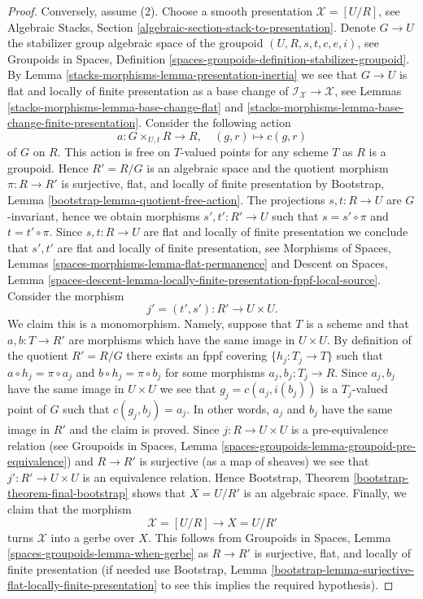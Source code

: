 \begin{proof}
\medskip\noindent
Conversely, assume (2). Choose a smooth presentation $\mathcal{X} = [U/R]$, see
Algebraic Stacks, Section \ref{algebraic-section-stack-to-presentation}.
Denote $G \to U$ the stabilizer group algebraic space of the groupoid
$(U, R, s, t, c, e, i)$, see
Groupoids in Spaces, Definition
\ref{spaces-groupoids-definition-stabilizer-groupoid}.
By
Lemma \ref{stacks-morphisms-lemma-presentation-inertia}
we see that $G \to U$ is flat and locally of finite presentation as
a base change of $\mathcal{I}_\mathcal{X} \to \mathcal{X}$, see
Lemmas \ref{stacks-morphisms-lemma-base-change-flat} and
\ref{stacks-morphisms-lemma-base-change-finite-presentation}.
Consider the following action
$$
a : G \times_{U, t} R \to R, \quad (g, r) \mapsto c(g, r)
$$
of $G$ on $R$. This action is free on $T$-valued points for any
scheme $T$ as $R$ is a groupoid. Hence $R' = R/G$ is an algebraic
space and the quotient morphism $\pi : R \to R'$ is surjective,
flat, and locally of finite presentation by
Bootstrap, Lemma \ref{bootstrap-lemma-quotient-free-action}.
The projections $s, t : R \to U$ are $G$-invariant, hence
we obtain morphisms $s' , t' : R' \to U$ such that $s = s' \circ \pi$
and $t = t' \circ \pi$.
Since $s, t : R \to U$ are flat and locally of finite presentation
we conclude that $s', t'$ are flat and locally of finite presentation, see
Morphisms of Spaces, Lemmas
\ref{spaces-morphisms-lemma-flat-permanence} and
Descent on Spaces, Lemma
\ref{spaces-descent-lemma-locally-finite-presentation-fppf-local-source}.
Consider the morphism
$$
j' = (t', s') : R' \longrightarrow U \times U.
$$
We claim this is a monomorphism. Namely, suppose that $T$ is a scheme
and that $a, b : T \to R'$ are morphisms which have the same image
in $U \times U$. By definition of the quotient $R' = R/G$ there
exists an fppf covering $\{h_j : T_j \to T\}$ such
that $a \circ h_j = \pi \circ a_j$ and $b \circ h_j = \pi \circ b_j$
for some morphisms $a_j, b_j : T_j \to R$. Since $a_j, b_j$ have the same
image in $U \times U$ we see that $g_j = c(a_j, i(b_j))$ is a $T_j$-valued
point of $G$ such that $c(g_j, b_j) = a_j$. In other words, $a_j$ and
$b_j$ have the same image in $R'$ and the claim is proved.
Since $j : R \to U \times U$ is a pre-equivalence relation (see
Groupoids in Spaces, Lemma
\ref{spaces-groupoids-lemma-groupoid-pre-equivalence})
and $R \to R'$ is surjective (as a map of sheaves) we see that
$j' : R' \to U \times U$ is an equivalence relation.
Hence
Bootstrap, Theorem \ref{bootstrap-theorem-final-bootstrap}
shows that $X = U/R'$ is an algebraic space.
Finally, we claim that the morphism
$$
\mathcal{X} = [U/R] \longrightarrow X = U/R'
$$
turns $\mathcal{X}$ into a gerbe over $X$. This follows from
Groupoids in Spaces, Lemma \ref{spaces-groupoids-lemma-when-gerbe}
as $R \to R'$ is surjective, flat, and locally of finite presentation
(if needed use
Bootstrap, Lemma
\ref{bootstrap-lemma-surjective-flat-locally-finite-presentation}
to see this implies the required hypothesis).
\end{proof}

